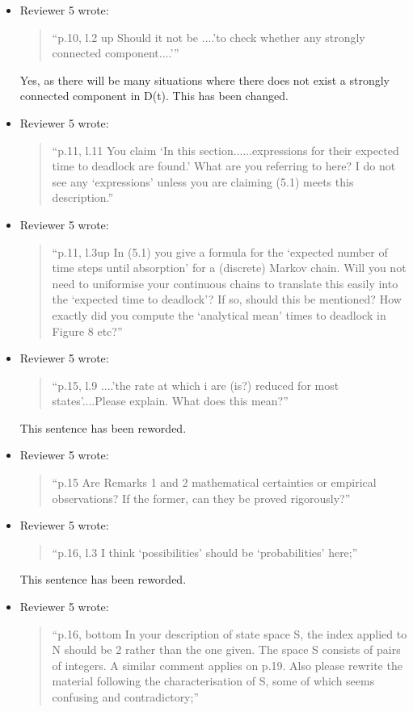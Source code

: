 \documentclass{article}
\begin{document}
\begin{itemize}
\item Reviewer 5 wrote:
\begin{quote}
``p.10, l.2 up Should it not be ....’to check whether any strongly connected component....’''
\end{quote}

Yes, as there will be many situations where there does not exist a strongly connected component in D(t). This has been changed.


\item Reviewer 5 wrote:
\begin{quote}
``p.11, l.11 You claim ‘In this section......expressions for their expected time to deadlock are found.’ What are you referring to here? I do not see any ‘expressions’ unless you are claiming (5.1) meets this description.''
\end{quote}


\item Reviewer 5 wrote:
\begin{quote}
``p.11, l.3up In (5.1) you give a formula for the ‘expected number of time steps until absorption’ for a (discrete) Markov chain. Will you not need to uniformise your continuous chains to translate this easily into the ‘expected time to deadlock’? If so, should this be mentioned? How exactly did you compute the ‘analytical mean’ times to deadlock in Figure 8 etc?''
\end{quote}

\item Reviewer 5 wrote:
\begin{quote}
``p.15, l.9 ....’the rate at which i are (is?) reduced for most states’....Please explain. What does this mean?''
\end{quote}

This sentence has been reworded.


\item Reviewer 5 wrote:
\begin{quote}
``p.15 Are Remarks 1 and 2 mathematical certainties or empirical observations? If the former, can they be proved rigorously?''
\end{quote}

\item Reviewer 5 wrote:
\begin{quote}
``p.16, l.3 I think ‘possibilities’ should be ‘probabilities’ here;''
\end{quote}

This sentence has been reworded.


\item Reviewer 5 wrote:
\begin{quote}
``p.16, bottom In your description of state space S, the index applied to N should be 2 rather than the one given. The space S consists of pairs of integers. A similar comment applies on p.19. Also please rewrite the material following the characterisation of S, some of which seems confusing and contradictory;''
\end{quote}



\end{itemize}
\end{document}

